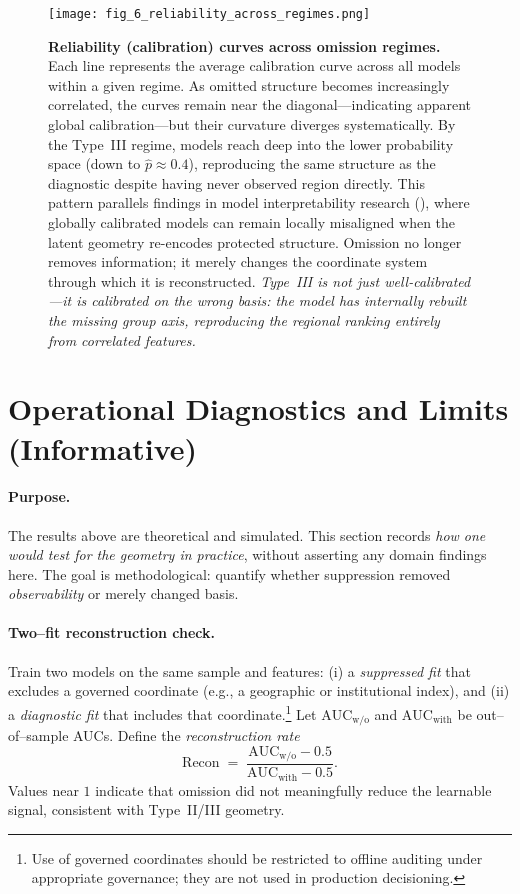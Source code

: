 \documentclass[11pt]{article}
\begin{document}
\begin{figure}[H]
  \centering
  \texttt{[image: fig\_6\_reliability\_across\_regimes.png]}
  \caption{\textbf{Reliability (calibration) curves across omission regimes.}
  Each line represents the average calibration curve across all models within a given regime.  
  As omitted structure becomes increasingly correlated, the curves remain near the diagonal—indicating apparent global calibration—but their curvature diverges systematically.  
  By the Type~III regime, models reach deep into the lower probability space (down to $\hat{p}\!\approx\!0.4$), reproducing the same structure as the diagnostic despite having never observed region directly.  
  This pattern parallels findings in model interpretability research
(\citealp{lipton2018mythos}),
where globally calibrated models can remain locally misaligned
when the latent geometry re-encodes protected structure.
Omission no longer removes information; it merely changes the coordinate system through which it is reconstructed.  
  \emph{Type~III is not just well-calibrated—it is calibrated on the wrong basis: the model has internally rebuilt the missing group axis, reproducing the regional ranking entirely from correlated features.}}
  \label{fig:calibration}
\end{figure}


\section{Operational Diagnostics and Limits (Informative)}
\label{sec:ops}

\paragraph{Purpose.}
The results above are theoretical and simulated. This section records \emph{how one would test for the geometry in practice}, without asserting any domain findings here. The goal is methodological: quantify whether suppression removed \emph{observability} or merely changed basis.

\paragraph{Two–fit reconstruction check.}
Train two models on the same sample and features:
(i) a \emph{suppressed fit} that excludes a governed coordinate (e.g., a geographic or institutional index), and
(ii) a \emph{diagnostic fit} that includes that coordinate.\footnote{Use of governed coordinates should be restricted to offline auditing under appropriate governance; they are not used in production decisioning.}
Let $\mathrm{AUC}_{\text{w/o}}$ and $\mathrm{AUC}_{\text{with}}$ be out–of–sample AUCs. Define the \emph{reconstruction rate}
\[
\mathrm{Recon} \;=\; \frac{\mathrm{AUC}_{\text{w/o}} - 0.5}{\mathrm{AUC}_{\text{with}} - 0.5}.
\]
Values near $1$ indicate that omission did not meaningfully reduce the learnable signal, consistent with Type~II/III geometry.
\end{document}
